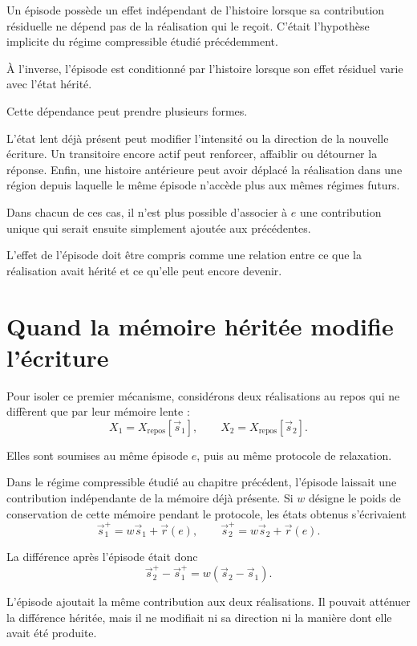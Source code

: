 Un épisode possède un effet indépendant de l'histoire lorsque sa contribution résiduelle ne dépend pas de la réalisation qui le reçoit. C'était l'hypothèse implicite du régime compressible étudié précédemment.

À l'inverse, l'épisode est conditionné par l'histoire lorsque son effet
résiduel varie avec l'état hérité.

Cette dépendance peut prendre plusieurs formes.

L'état lent déjà présent peut modifier l'intensité ou la direction de la nouvelle écriture. Un transitoire encore actif peut renforcer, affaiblir ou détourner la réponse. Enfin, une histoire antérieure peut avoir déplacé la réalisation dans une région depuis laquelle le même épisode n'accède plus aux mêmes régimes futurs.

Dans chacun de ces cas, il n'est plus possible d'associer à $e$ une contribution unique qui serait ensuite simplement ajoutée aux précédentes.

L'effet de l'épisode doit être compris comme une relation entre ce que la réalisation avait hérité et ce qu'elle peut encore devenir.

\section{Quand la mémoire héritée modifie l'écriture}
\label{t3-memoire-heritee-modifie-ecriture}

Pour isoler ce premier mécanisme, considérons deux réalisations au repos qui ne diffèrent que par leur mémoire lente :
\[
X_1=X_{\mathrm{repos}}[\vec s_1],
\qquad
X_2=X_{\mathrm{repos}}[\vec s_2].
\]

Elles sont soumises au même épisode $e$, puis au même protocole de relaxation.

Dans le régime compressible étudié au chapitre précédent, l'épisode laissait une contribution indépendante de la mémoire déjà présente. Si $w$ désigne le poids de conservation de cette mémoire pendant le protocole, les états obtenus s'écrivaient
\[
\vec s_1^{+}
=
w\vec s_1+\vec r(e),
\qquad
\vec s_2^{+}
=
w\vec s_2+\vec r(e).
\]

La différence après l'épisode était donc
\[
\vec s_2^{+}-\vec s_1^{+}
=
w\left(\vec s_2-\vec s_1\right).
\]

L'épisode ajoutait la même contribution aux deux réalisations. Il pouvait atténuer la différence héritée, mais il ne modifiait ni sa direction ni la manière dont elle avait été produite.

